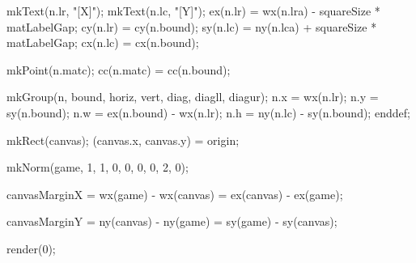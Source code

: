   mkText(n.lr, "[X]");
  mkText(n.lc, "[Y]");
  ex(n.lr) = wx(n.lra) - squareSize * matLabelGap;
  cy(n.lr) = cy(n.bound);
  sy(n.lc) = ny(n.lca) + squareSize * matLabelGap;
  cx(n.lc) = cx(n.bound);

  mkPoint(n.matc);
  cc(n.matc) = cc(n.bound);

  mkGroup(n, bound, horiz, vert, diag, diagll, diagur);
  n.x = wx(n.lr);
  n.y = sy(n.bound);
  n.w = ex(n.bound) - wx(n.lr);
  n.h = ny(n.lc) - sy(n.bound);
enddef;


mkRect(canvas);
(canvas.x, canvas.y) = origin;

mkNorm(game, 1, 1, 0, 0, 0, 0, 2, 0);

canvasMarginX =
wx(game) - wx(canvas) =
ex(canvas) - ex(game);

canvasMarginY =
ny(canvas) - ny(game) =
sy(game) - sy(canvas);

\stopMPinitializations

\startMPpage
  render(0);
\stopMPpage

